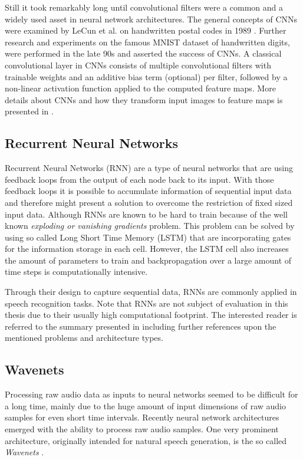 Still it took remarkably long until convolutional filters were a common and a widely used asset in neural network architectures.
The general concepts of CNNs were examined by LeCun et al. on handwritten postal codes in 1989 \cite{LeCun1989_Generalization}.
Further research and experiments on the famous MNIST dataset of handwritten digits, were performed in the late 90s \cite{LeCun1998} and asserted the success of CNNs.
A classical convolutional layer in CNNs consists of multiple convolutional filters with trainable weights and an additive bias term (optional) per filter, followed by a non-linear activation function applied to the computed feature maps.
More details about CNNs and how they transform input images to feature maps is presented in .



\subsection{Recurrent Neural Networks}\label{sec:prev_nn_rnn}
Recurrent Neural Networks (RNN) are a type of neural networks that are using feedback loops from the output of each node back to its input.
With those feedback loops it is possible to accumulate information of sequential input data and therefore might present a solution to overcome the restriction of fixed sized input data.
Although RNNs are known to be hard to train because of the well known \emph{exploding or vanishing gradients} problem.
This problem can be solved by using so called Long Short Time Memory (LSTM) that are incorporating gates for the information storage in each cell. 
However, the LSTM cell also increases the amount of parameters to train and backpropagation over a large amount of time steps is computationally intensive.

Through their design to capture sequential data, RNNs are commonly applied in speech recognition tasks.
Note that RNNs are not subject of evaluation in this thesis due to their usually high computational footprint.
The interested reader is referred to the summary presented in \cite{Staudenmeyer2019} including further references upon the mentioned problems and architecture types.



\subsection{Wavenets}\label{sec:prev_nn_wavenet}
Processing raw audio data as inputs to neural networks seemed to be difficult for a long time, mainly due to the huge amount of input dimensions of raw audio samples for even short time intervals.
Recently neural network architectures emerged with the ability to process raw audio samples.
One very prominent architecture, originally intended for natural speech generation, is the so called \emph{Wavenets} \cite{Oord2016}.

